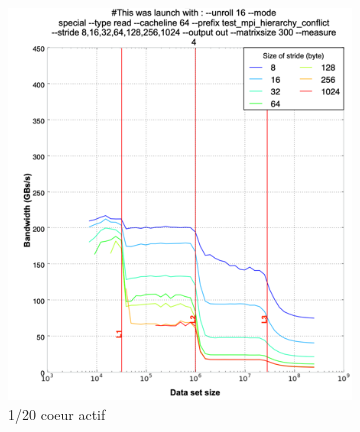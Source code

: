         \begin{figure}
        \centering
            \begin{subfigure}[b]{0.47\linewidth}
            \includegraphics[width=\linewidth]{images/dml_cache_1core.png}
            \caption{1/20 coeur actif}
            \label{pic:dml_cache_1core}
            \end{subfigure}
        ~ %
            \begin{subfigure}[b]{0.47\linewidth}

\end{subfigure}
\end{figure}
